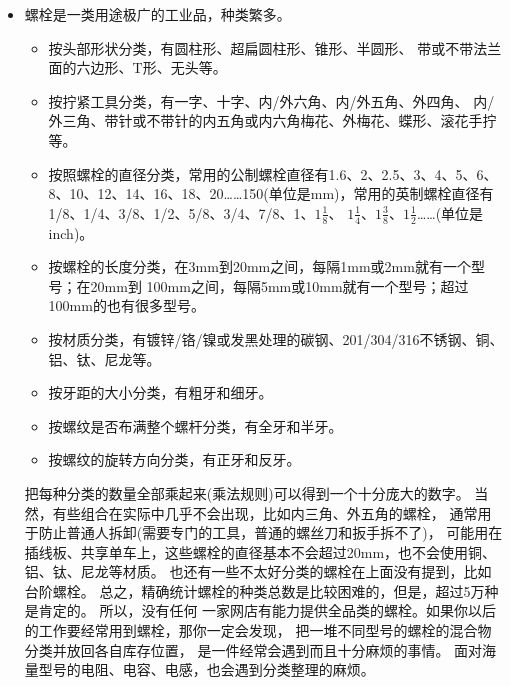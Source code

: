 \begin{itemize}[leftmargin=\inteval{\myitemleftmargin}pt,itemsep=
   \inteval{\myitemitempsep}pt,topsep=\inteval{\myitemtopsep}pt]
\item 螺栓是一类用途极广的工业品，种类繁多。
\begin{itemize}[label=$\circ$]
    \item 按头部形状分类，有圆柱形、超扁圆柱形、锥形、半圆形、
    带或不带法兰面的六边形、T形、无头等。
    \item 按拧紧工具分类，有一字、十字、内/外六角、内/外五角、外四角、
    内/外三角、带针或不带针的内五角或内六角梅花、外梅花、蝶形、滚花手拧等。
    \item 按照螺栓的直径分类，常用的公制螺栓直径有1.6、2、2.5、3、4、5、6、
    8、10、12、14、16、18、20……150(单位是mm)，常用的英制螺栓直径有
    1/8、1/4、3/8、1/2、5/8、3/4、7/8、1、$1\frac{1}{8}$、
    $1\frac{1}{4}$、$1\frac{3}{8}$、$1\frac{1}{2}$……(单位是inch)。
    \item 按螺栓的长度分类，在3mm到20mm之间，每隔1mm或2mm就有一个型号；在20mm到
    100mm之间，每隔5mm或10mm就有一个型号；超过100mm的也有很多型号。
    \item 按材质分类，有镀锌/铬/镍或发黑处理的碳钢、201/304/316不锈钢、铜、铝、钛、尼龙等。
    \item 按牙距的大小分类，有粗牙和细牙。
    \item 按螺纹是否布满整个螺杆分类，有全牙和半牙。
    \item 按螺纹的旋转方向分类，有正牙和反牙。
\end{itemize}
把每种分类的数量全部乘起来(乘法规则)可以得到一个十分庞大的数字。
当然，有些组合在实际中几乎不会出现，比如内三角、外五角的螺栓，
通常用于防止普通人拆卸(需要专门的工具，普通的螺丝刀和扳手拆不了)，
可能用在插线板、共享单车上，这些螺栓的直径基本不会超过20mm，也不会使用铜、铝、钛、尼龙等材质。
也还有一些不太好分类的螺栓在上面没有提到，比如台阶螺栓。
总之，精确统计螺栓的种类总数是比较困难的，但是，超过5万种是肯定的。
所以，没有任何
一家网店有能力提供全品类的螺栓。如果你以后的工作要经常用到螺栓，那你一定会发现，
把一堆不同型号的螺栓的混合物分类并放回各自库存位置，
是一件经常会遇到而且十分麻烦的事情。
面对海量型号的电阻、电容、电感，也会遇到分类整理的麻烦。

\end{itemize}

